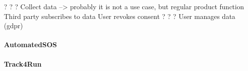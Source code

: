 \documentclass[../../rasd.tex]{subfiles}
\begin{document}
			? ? ? Collect data --> probably it is not a use case, but regular product function
			Third party subscribes to data
			User revokes consent
			? ? ? User manages data (gdpr)


			\paragraph{AutomatedSOS}

			\paragraph{Track4Run}
\end{document}
